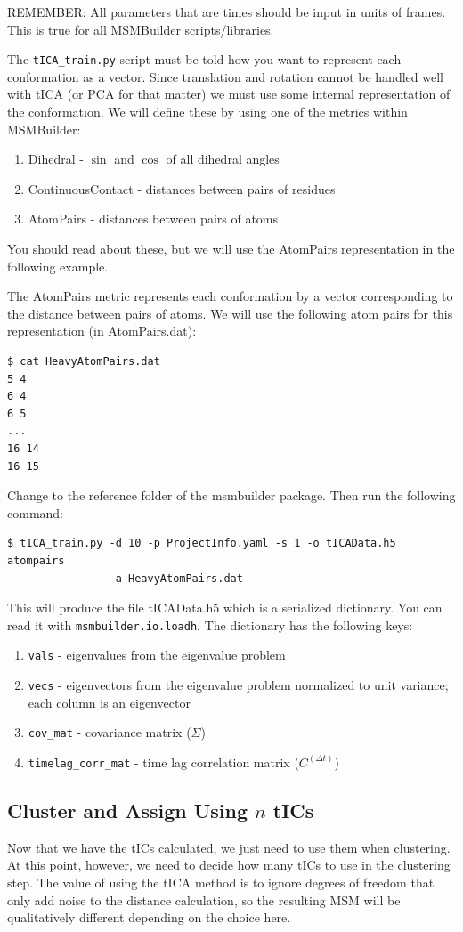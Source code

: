 \documentclass[12pt]{article}
\begin{document}
REMEMBER: All parameters that are times should be input in units of frames. This is true for all MSMBuilder scripts/libraries.

The \texttt{tICA\_train.py} script must be told how you want to represent each conformation as a vector. Since translation and rotation cannot be handled well with tICA (or PCA for that matter) we must use some internal representation of the conformation. We will define these by using one of the metrics within MSMBuilder:
\begin{enumerate}
\item Dihedral - $\sin$ and $\cos$ of all dihedral angles 
\item ContinuousContact - distances between pairs of residues
\item AtomPairs - distances between pairs of atoms
\end{enumerate} You should read about these, but we will use the AtomPairs representation in the following example.

The AtomPairs metric represents each conformation by a vector corresponding to the distance between pairs of atoms. We will use the following atom pairs for this representation (in AtomPairs.dat):

\begin{verbatim}
$ cat HeavyAtomPairs.dat
5 4
6 4
6 5
...
16 14
16 15
\end{verbatim}
Change to the reference folder of the msmbuilder package. Then run the following command:
\begin{verbatim}
$ tICA_train.py -d 10 -p ProjectInfo.yaml -s 1 -o tICAData.h5 atompairs 
                -a HeavyAtomPairs.dat
\end{verbatim} This will produce the file tICAData.h5 which is a serialized dictionary. You can read it with \texttt{msmbuilder.io.loadh}. The dictionary has the following keys:
\begin{enumerate}
\item \texttt{vals} - eigenvalues from the eigenvalue problem
\item \texttt{vecs} - eigenvectors from the eigenvalue problem normalized to unit variance; each column is an eigenvector
\item \texttt{cov\_mat} - covariance matrix ($\Sigma$)
\item \texttt{timelag\_corr\_mat} - time lag correlation matrix ($C^{(\Delta t)}$)
\end{enumerate} 

\subsection{Cluster and Assign Using $n$ tICs}
Now that we have the tICs calculated, we just need to use them when clustering. At this point, however, we need to decide how many tICs to use in the clustering step. The value of using the tICA method is to ignore degrees of freedom that only add noise to the distance calculation, so the resulting MSM will be qualitatively different depending on the choice here. 
\end{document}
